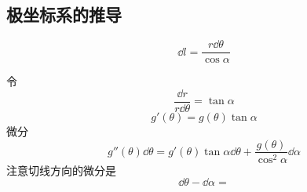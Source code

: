 \subsection{极坐标系的推导}
\begin{equation}
\dd{l} = \frac{r\dd{\theta}}{\cos\alpha}
\end{equation}

令
\begin{equation}
\frac{\dd{r}}{r \dd{\theta}} = \tan\alpha
\end{equation}
\begin{equation}
g'(\theta) = g(\theta)\tan\alpha
\end{equation}
微分
\begin{equation}
g''(\theta)\dd{\theta} = g'(\theta)\tan\alpha\dd{\theta} + \frac{g(\theta)}{\cos^2\alpha}\dd{\alpha}
\end{equation}
注意切线方向的微分是
\begin{equation}
\dd{\theta} - \dd{\alpha} = 
\end{equation}
